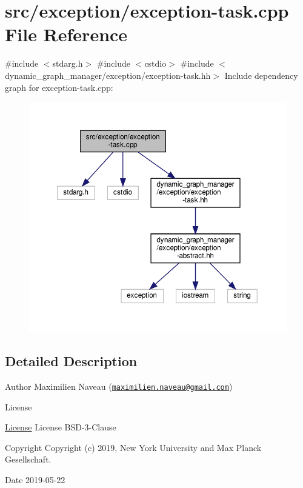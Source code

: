 \hypertarget{exception-task_8cpp}{}\section{src/exception/exception-\/task.cpp File Reference}
\label{exception-task_8cpp}
{\ttfamily \#include $<$stdarg.\+h$>$}\newline
{\ttfamily \#include $<$cstdio$>$}\newline
{\ttfamily \#include $<$dynamic\+\_\+graph\+\_\+manager/exception/exception-\/task.\+hh$>$}\newline
Include dependency graph for exception-\/task.cpp\+:
\nopagebreak
\begin{figure}[H]
\begin{center}
\leavevmode
\includegraphics[width=350pt]{exception-task_8cpp__incl}
\end{center}
\end{figure}


\subsection{Detailed Description}
\begin{DoxyAuthor}{Author}
Maximilien Naveau (\href{mailto:maximilien.naveau@gmail.com}{\tt maximilien.\+naveau@gmail.\+com}) 
\end{DoxyAuthor}
\begin{DoxyRefDesc}{License}
\item[\hyperlink{license__license000049}{License}]License B\+S\+D-\/3-\/\+Clause \end{DoxyRefDesc}
\begin{DoxyCopyright}{Copyright}
Copyright (c) 2019, New York University and Max Planck Gesellschaft. 
\end{DoxyCopyright}
\begin{DoxyDate}{Date}
2019-\/05-\/22 
\end{DoxyDate}
